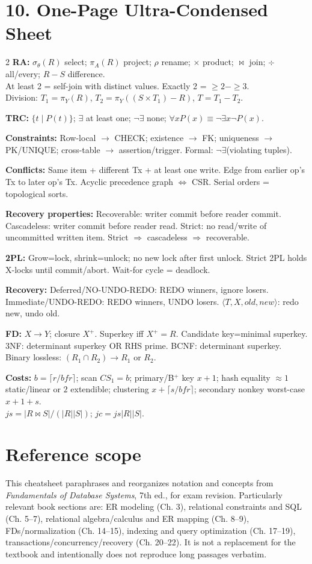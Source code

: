 \documentclass[10pt,a4paper]{article}
\begin{document}
\section{10. One-Page Ultra-Condensed Sheet}
\small
\begin{multicols}{2}
\textbf{RA:}
$\sigma_\theta(R)$ select; $\pi_A(R)$ project; $\rho$ rename; $\times$ product; $\bowtie$ join; $\div$ all/every; $R-S$ difference.\\
At least 2 = self-join with distinct values. Exactly 2 = $\ge2-\ge3$.\\
Division: $T_1=\pi_Y(R)$, $T_2=\pi_Y((S\times T_1)-R)$, $T=T_1-T_2$.

\textbf{TRC:}
$\{t\mid P(t)\}$; $\exists$ at least one; $\neg\exists$ none; $\forall x P(x)\equiv\neg\exists x\neg P(x)$.

\textbf{Constraints:}
Row-local $\to$ CHECK; existence $\to$ FK; uniqueness $\to$ PK/UNIQUE; cross-table $\to$ assertion/trigger. Formal: $\neg\exists$(violating tuples).

\textbf{Conflicts:}
Same item + different Tx + at least one write. Edge from earlier op's Tx to later op's Tx. Acyclic precedence graph $\Leftrightarrow$ CSR. Serial orders = topological sorts.

\textbf{Recovery properties:}
Recoverable: writer commit before reader commit. Cascadeless: writer commit before reader read. Strict: no read/write of uncommitted written item. Strict $\Rightarrow$ cascadeless $\Rightarrow$ recoverable.

\textbf{2PL:}
Grow=lock, shrink=unlock; no new lock after first unlock. Strict 2PL holds X-locks until commit/abort. Wait-for cycle = deadlock.

\textbf{Recovery:}
Deferred/NO-UNDO-REDO: REDO winners, ignore losers. Immediate/UNDO-REDO: REDO winners, UNDO losers. $\langle T,X,old,new\rangle$: redo new, undo old.

\textbf{FD:}
$X\to Y$; closure $X^+$. Superkey iff $X^+=R$. Candidate key=minimal superkey. 3NF: determinant superkey OR RHS prime. BCNF: determinant superkey. Binary lossless: $(R_1\cap R_2)\to R_1$ or $R_2$.

\textbf{Costs:}
$b=\lceil r/bfr\rceil$; scan $CS_1=b$; primary/B$^+$ key $x+1$; hash equality $\approx1$ static/linear or $2$ extendible; clustering $x+\lceil s/bfr\rceil$; secondary nonkey worst-case $x+1+s$.\\
$js=|R\bowtie S|/(|R||S|)$; $jc=js|R||S|$.
\end{multicols}
\normalsize

\section*{Reference scope}
This cheatsheet paraphrases and reorganizes notation and concepts from \emph{Fundamentals of Database Systems}, 7th ed., for exam revision. Particularly relevant book sections are: ER modeling (Ch. 3), relational constraints and SQL (Ch. 5--7), relational algebra/calculus and ER mapping (Ch. 8--9), FDs/normalization (Ch. 14--15), indexing and query optimization (Ch. 17--19), transactions/concurrency/recovery (Ch. 20--22). It is not a replacement for the textbook and intentionally does not reproduce long passages verbatim.
\end{document}
